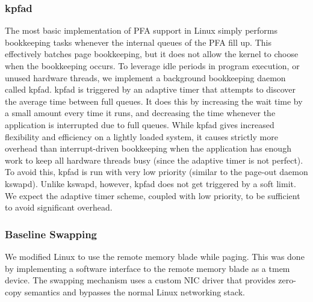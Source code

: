 %
%
\subsubsection{kpfad} \label{sec:kpfad}
The most basic implementation of PFA support in Linux simply performs
bookkeeping tasks whenever the internal queues of the PFA fill up. This
effectively batches page bookkeeping, but it does not allow the kernel to
choose when the bookkeeping occurs. To leverage idle periods in
program execution, or unused hardware threads, we implement a background
bookkeeping daemon called \gls{kpfad}. \Gls{kpfad} is triggered by an adaptive
timer that attempts to discover the average time between full queues. It does
this by increasing the wait time by a small amount every time it runs, and
decreasing the time whenever the application is interrupted due to full queues. 
While \gls{kpfad} gives increased flexibility and efficiency on a lightly
loaded system, it causes strictly more overhead than interrupt-driven
bookkeeping when the application has enough work to keep all hardware threads
busy (since the adaptive timer is not perfect). To avoid this, \gls{kpfad} is run
with very low priority (similar to the page-out daemon \gls{kswapd}). Unlike
\gls{kswapd}, however, \gls{kpfad} does not get triggered by a soft limit. We expect
the adaptive timer scheme, coupled with low priority, to be sufficient to avoid
significant overhead.

\subsubsection{Baseline Swapping}
We modified Linux to use the remote memory blade while paging. This was done by
implementing a software interface to the remote memory blade as a \gls{tmem}
device. The swapping mechanism uses a custom NIC driver that provides zero-copy
semantics and bypasses the normal Linux networking stack. 

